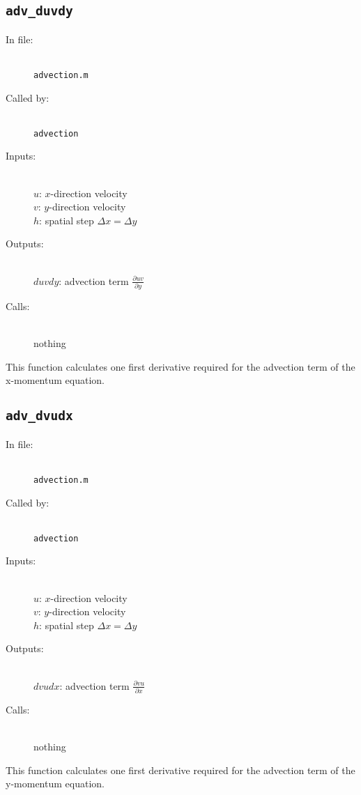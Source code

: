 \documentclass[12pt]{article}
\begin{document}
\subsection{\texttt{adv\_duvdy}}
\begin{description}
\item[In file:] \hfill \\ \texttt{advection.m}
\item[Called by:] \hfill \\ \texttt{advection}
\item[Inputs:] \hfill \\ $u$: $x$-direction velocity \\ $v$: $y$-direction velocity \\$h$: spatial step $\Delta x = \Delta y$
\item[Outputs:] \hfill \\ $duvdy$: advection term $\frac{\partial uv}{\partial y}$
\item[Calls:] \hfill \\ nothing
\end{description}
This function calculates one first derivative required for the advection term of the x-momentum equation.

\subsection{\texttt{adv\_dvudx}}
\begin{description}
\item[In file:] \hfill \\ \texttt{advection.m}
\item[Called by:] \hfill \\ \texttt{advection}
\item[Inputs:] \hfill \\ $u$: $x$-direction velocity \\ $v$: $y$-direction velocity \\$h$: spatial step $\Delta x = \Delta y$
\item[Outputs:] \hfill \\ $dvudx$: advection term $\frac{\partial vu}{\partial x}$
\item[Calls:] \hfill \\ nothing
\end{description}
This function calculates one first derivative required for the advection term of the y-momentum equation.
\end{document}
